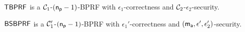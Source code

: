 \begin{theorem}
\label{thm:tnike-bprf-security}
	$\mathsf{TBPRF}$ is a $\mathcal{C}_1$-$(\mathsf{n_p}-1)$-BPRF with $\epsilon_1$-correctness and $\mathcal{C}_2$-$\epsilon_2$-security.
\end{theorem}
\begin{theorem}
\label{thm:bsnike-bprf-security}
	$\mathsf{BSBPRF}$ is a $\mathcal{C}_1^{\prime}$-$(\mathsf{n_p}-1)$-BPRF with $\epsilon_1'$-correctness and $(\mathsf{m_a},\allowbreak \epsilon^{\prime}, \epsilon_2')$-security.
\end{theorem}
